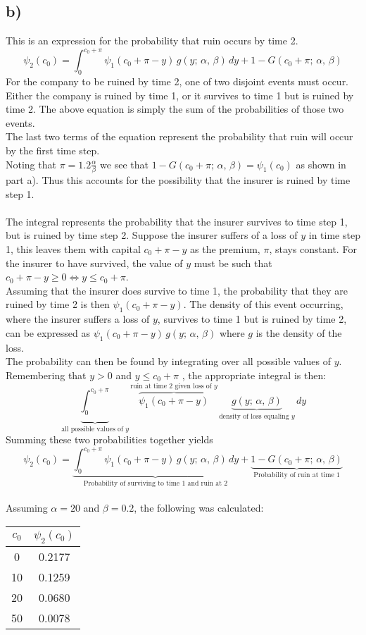 \documentclass[titlepage]{article}
\begin{document}
	\subsection{b)}
	This is an expression for the probability that ruin occurs by time 2.
	$$\psi_2(c_0) = \int_{0}^{c_0+\pi}\psi_1(c_0 + \pi - y)\,g(y;\,\alpha,\,\beta)\,dy + 1 - G(c_0 + \pi;\,\alpha,\,\beta)$$
	For the company to be ruined by time 2, one of two disjoint events must occur. Either the company is ruined by time 1, or it survives to time 1 but is ruined by time 2. The above equation is simply the sum of the probabilities of those two events.\\
	The last two terms of the equation represent the probability that ruin will occur by the first time step.\\
	Noting that $\pi = 1.2 \frac{\alpha}{\beta}$ we see that $1 - G(c_0 + \pi;\,\alpha,\,\beta) = \psi_1(c_0)$ as shown in part a). Thus this accounts for the possibility that the insurer is ruined by time step 1.\\\\
	The integral represents the probability that the insurer survives to time step 1, but is ruined by time step 2. Suppose the insurer suffers of a loss of $y$ in time step 1, this leaves them with capital $c_0 + \pi - y$ as the premium, $\pi$, stays constant. For the insurer to have survived, the value of $y$ must be such that $c_0 + \pi - y \geq 0 \Leftrightarrow y \leq c_0 + \pi$.\\
	Assuming that the insurer does survive to time 1, the probability that they are ruined by time 2 is then $\psi_1(c_0 + \pi - y)$. The density of this event occurring, where the insurer suffers a loss of $y$, survives to time 1 but is ruined by time 2, can be expressed as $\psi_1(c_0 + \pi -y)\, g(y;\,\alpha, \,\beta)$ where $g$ is the density of the loss.\\
	The probability can then be found by integrating over all possible values of $y$. Remembering that $y>0$ and $y\leq c_0 + \pi$ , the appropriate integral is then:
	$$\underbrace{\int_{0}^{c_0+\pi}}_\text{all possible values of $y$}\overbrace{\psi_1(c_0 + \pi - y)}^\text{ruin at time 2 given loss of $y$}\,\underbrace{g(y;\,\alpha,\,\beta)}_\text{density of loss equaling $y$}\,dy$$
	Summing these two probabilities together yields
		$$\psi_2(c_0) = \underbrace{\int_{0}^{c_0+\pi}\psi_1(c_0 + \pi - y)\,g(y;\,\alpha,\,\beta)\,dy}_\text{Probability of surviving to time 1 and ruin at 2} + \underbrace{1 - G(c_0 + \pi;\,\alpha,\,\beta)}_\text{Probability of ruin at time 1}$$
	\\
	Assuming $\alpha = 20$ and $\beta = 0.2$, the following was calculated:
		\begin{center}
		\begin{tabular}{ |c|c|} 
			\hline
			$c_0$ & $\psi_2(c_0)$ \\ 
			\hline
			0 &  0.2177  \\ 
			10 & 0.1259 \\ 
			20 & 0.0680 \\ 
			50 & 0.0078\\
			\hline
		\end{tabular}
	\end{center}
	
\end{document}
